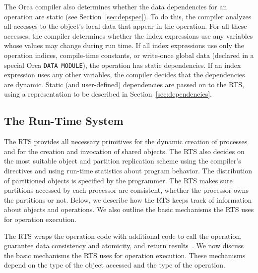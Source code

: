 \documentclass{acmtrans2e}
\begin{document}

The Orca compiler also determines whether the data dependencies
for an operation are static (see Section~\ref{sec:depspec}).
To do this, the compiler analyzes all accesses to the object's local data
that appear in the operation. For all these accesses, the compiler
determines whether the index expressions use any variables whose
values may change during run time. If all index expressions use only
the operation indices, compile-time constants, or write-once global data
(declared in a special Orca \verb+DATA MODULE+), the operation
has static dependencies.
If an index expression uses any other variables, the compiler
decides that the dependencies are dynamic.
Static (and user-defined) dependencies are passed on to the RTS,
using a representation to be described in Section~\ref{sec:dependencies}.

\subsection{The Run-Time System} 

The RTS provides all necessary primitives for the dynamic creation of
processes and for the creation and invocation of shared objects. The
RTS also decides on the most suitable object and partition replication
scheme using the compiler's directives and using run-time statistics
about program behavior. The
distribution of partitioned objects is specified by the
programmer. The RTS makes sure partitions accessed by each processor
are consistent, whether the processor owns the partitions or not.
Below, we describe how the RTS keeps
track of information about objects and operations. We also outline the
basic mechanisms the RTS uses for operation execution.

The RTS wraps the operation code with additional code to call the
operation, guarantee data consistency and atomicity, and return
results~\cite{oopsla96}.  We now discuss the basic mechanisms the
RTS uses for operation execution. These mechanisms depend on the type
of the object accessed and the type of the operation.
\end{document}
